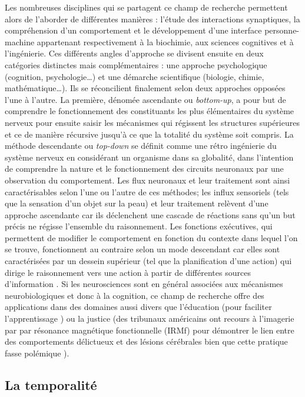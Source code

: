 \documentclass[12pt,fleqn,oneside,french,openany]{book} %
\begin{document}
Les nombreuses disciplines qui se partagent ce champ de recherche permettent alors de l'aborder de différentes manières : l'étude des interactions synaptiques, la compréhension d'un comportement et le développement d'une interface personne-machine appartenant respectivement à la biochimie, aux sciences cognitives et à l'ingénierie. Ces différents angles d'approche se divisent ensuite en deux catégories distinctes mais complémentaires : une approche psychologique (cognition, psychologie…) et une démarche scientifique (biologie, chimie, mathématique…). Ils se réconcilient finalement selon deux approches opposées l'une à l'autre. La première, dénomée ascendante ou \emph{bottom-up}, a pour but de comprendre le fonctionnement des constituants les plus élémentaires du système nerveux pour ensuite saisir les mécanismes qui régissent les structures supérieures et ce de manière récursive jusqu'à ce que la totalité du système soit compris. La méthode descendante ou \emph{top-down} se définit comme une rétro ingénierie du système nerveux en considérant un organisme dans sa globalité, dans l'intention de comprendre la nature et le fonctionnement des circuits neuronaux par une observation du comportement. Les flux neuronaux et leur traitement sont ainsi caractérisables selon l'une ou l'autre de ces méthodes; les influx sensoriels (tels que la sensation d'un objet sur la peau) et leur traitement relèvent d'une approche ascendante car ils déclenchent une cascade de réactions sans qu'un but précis ne régisse l'ensemble du raisonnement. Les fonctions exécutives, qui permettent de modifier le comportement en fonction du contexte dans lequel l'on se trouve, fonctionnent au contraire selon un mode descendant car elles sont caractérisées par un dessein supérieur (tel que la planification d'une action) qui dirige le raisonnement vers une action à partir de différentes sources d'information \cite{bottomupTopdown,foncExec}. 
Si les neurosciences sont en général associées aux mécanismes neurobiologiques et donc à la cognition, ce champ de recherche offre des applications dans des domaines aussi divers que l'éducation (pour faciliter l'apprentissage \cite{pédagogue}) ou la justice (des tribunaux américains ont recours à l'imagerie par par résonance magnétique fonctionnelle (IRMf) pour démontrer le lien entre des comportements délictueux et des lésions cérébrales bien que cette pratique fasse polémique \cite{justice}).

\subsection[La temporalité]{La temporalité \cite{reptemps,basePerception,perceptionTemps,tempsEtIllusions}} \label{ssec:temporalite} %
\end{document}

